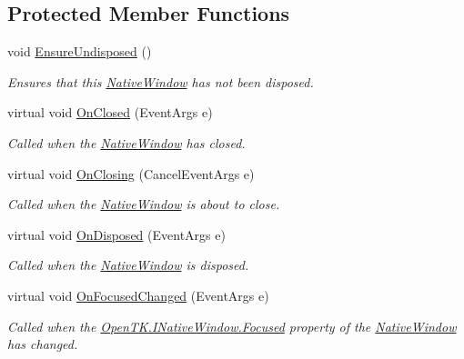 \subsection*{Protected Member Functions}
\begin{DoxyCompactItemize}
\item 
void \hyperlink{class_open_t_k_1_1_native_window_ae0abb4d6aa1dc7483948ec7ddf33c55e}{Ensure\-Undisposed} ()
\begin{DoxyCompactList}\small\item\em Ensures that this \hyperlink{class_open_t_k_1_1_native_window}{Native\-Window} has not been disposed. \end{DoxyCompactList}\item 
virtual void \hyperlink{class_open_t_k_1_1_native_window_affb5f7e8fddfe0865504dbc0a0cbd380}{On\-Closed} (Event\-Args e)
\begin{DoxyCompactList}\small\item\em Called when the \hyperlink{class_open_t_k_1_1_native_window}{Native\-Window} has closed. \end{DoxyCompactList}\item 
virtual void \hyperlink{class_open_t_k_1_1_native_window_a5082904386942ea2884f148ceb68fe00}{On\-Closing} (Cancel\-Event\-Args e)
\begin{DoxyCompactList}\small\item\em Called when the \hyperlink{class_open_t_k_1_1_native_window}{Native\-Window} is about to close. \end{DoxyCompactList}\item 
virtual void \hyperlink{class_open_t_k_1_1_native_window_a59f4ca5c53d636d1463c9d7f18c5bb22}{On\-Disposed} (Event\-Args e)
\begin{DoxyCompactList}\small\item\em Called when the \hyperlink{class_open_t_k_1_1_native_window}{Native\-Window} is disposed. \end{DoxyCompactList}\item 
virtual void \hyperlink{class_open_t_k_1_1_native_window_a2640077fe274ad83e308466969db0100}{On\-Focused\-Changed} (Event\-Args e)
\begin{DoxyCompactList}\small\item\em Called when the \hyperlink{interface_open_t_k_1_1_i_native_window_aaa2ef631c8bd4bcbef3374dfaeb50299}{Open\-T\-K.\-I\-Native\-Window.\-Focused} property of the \hyperlink{class_open_t_k_1_1_native_window}{Native\-Window} has changed. \end{DoxyCompactList}\item 

\end{DoxyCompactItemize}
